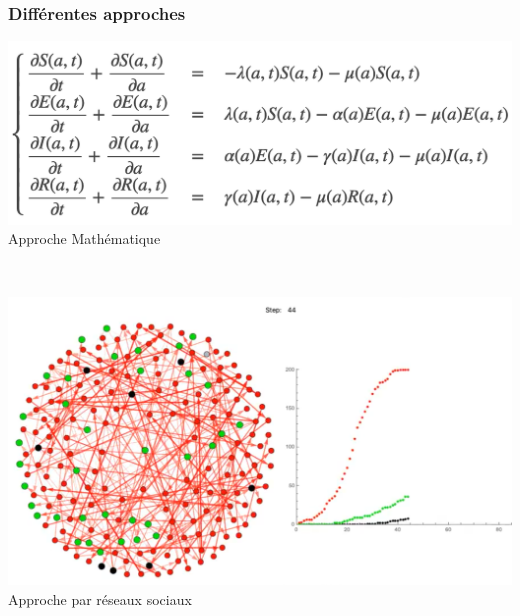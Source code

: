 \documentclass[a4paper]{cours-bdd}
\begin{document}
  

\begin{frame}[fragile]
  \frametitle{Différentes approches}

  \begin{minipage}[b]{0.45\columnwidth}
    \vspace{0.0cm}
    \includegraphics[width=\linewidth]{approcheMath.png} \\
    Approche Mathématique 
      \end{minipage}    
  \hfill \ 
  \begin{minipage}[b]{0.45\columnwidth}
        \vspace{0.0cm}
        \includegraphics[width=0.8\linewidth]{approcheNetwork.png} \\
        Approche par réseaux sociaux
      \end{minipage}
      \ 


\end{frame}
\end{document}
